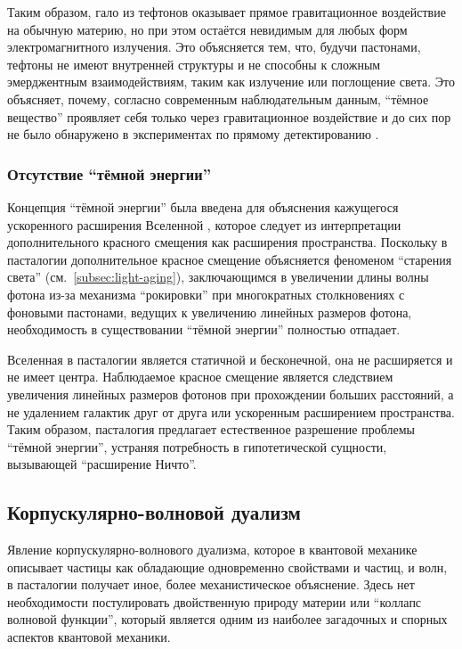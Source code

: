 \documentclass[pdflatex,sn-mathphys-num]{sn-jnl}
\begin{document}
Таким образом, гало из тефтонов оказывает прямое гравитационное воздействие на обычную материю, но при этом остаётся невидимым для любых форм электромагнитного излучения. Это объясняется тем, что, будучи пастонами, тефтоны не имеют внутренней структуры и не способны к сложным эмерджентным взаимодействиям, таким как излучение или поглощение света. Это объясняет, почему, согласно современным наблюдательным данным, ``тёмное вещество'' проявляет себя только через гравитационное воздействие и до сих пор не было обнаружено в экспериментах по прямому детектированию \cite{bertone2005-review}.

\subsubsection{Отсутствие ``тёмной энергии''}\label{subsubsec:no-dark-energy}

Концепция ``тёмной энергии'' была введена для объяснения кажущегося ускоренного расширения Вселенной \cite{riess1998}, которое следует из интерпретации дополнительного красного смещения как расширения пространства. Поскольку в пасталогии дополнительное красное смещение объясняется феноменом ``старения света'' (см.~\ref{subsec:light-aging}), заключающимся в увеличении длины волны фотона из-за механизма ``рокировки'' при многократных столкновениях с фоновыми пастонами, ведущих к увеличению линейных размеров фотона, необходимость в существовании ``тёмной энергии'' полностью отпадает.

Вселенная в пасталогии является статичной и бесконечной, она не расширяется и не имеет центра. Наблюдаемое красное смещение является следствием увеличения линейных размеров фотонов при прохождении больших расстояний, а не удалением галактик друг от друга или ускоренным расширением пространства. Таким образом, пасталогия предлагает естественное разрешение проблемы ``тёмной энергии'', устраняя потребность в гипотетической сущности, вызывающей ``расширение Ничто''.

\subsection{Корпускулярно-волновой дуализм}\label{subsec:wave-particle-duality}

Явление корпускулярно-волнового дуализма, которое в квантовой механике описывает частицы как обладающие одновременно свойствами и частиц, и волн, в пасталогии получает иное, более механистическое объяснение. Здесь нет необходимости постулировать двойственную природу материи или ``коллапс волновой функции'', который является одним из наиболее загадочных и спорных аспектов квантовой механики.
\end{document}
